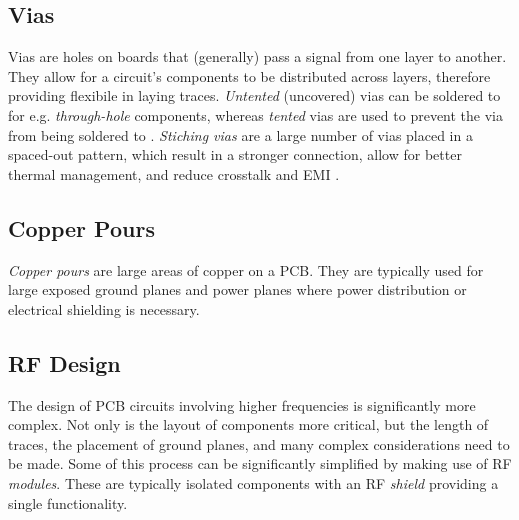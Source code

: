\subsection{Vias}
Vias are holes on boards that (generally) pass a signal from one layer to another. They allow for a circuit's components to be distributed across layers, therefore providing flexibile in laying traces. \textit{Untented} (uncovered) vias can be soldered to for e.g. \textit{through-hole} components, whereas \textit{tented} vias are used to prevent the via from being soldered to \cite{site-pcbBasics}. \textit{Stiching vias} are a large number of vias placed in a spaced-out pattern, which result in a stronger connection, allow for better thermal management, and reduce crosstalk and EMI \cite{site-viaStitching}.

\subsection{Copper Pours}
\textit{Copper pours} are large areas of copper on a PCB. They are typically used for large exposed ground planes and power planes where power distribution or electrical shielding is necessary.

\subsection{RF Design}\label{sec:pcbRFDesign}
The design of PCB circuits involving higher frequencies is significantly more complex. Not only is the layout of components more critical, but the length of traces, the placement of ground planes, and many complex considerations need to be made. Some of this process can be significantly simplified by making use of RF \textit{modules}. These are typically isolated components with an RF \textit{shield} providing a single functionality.

